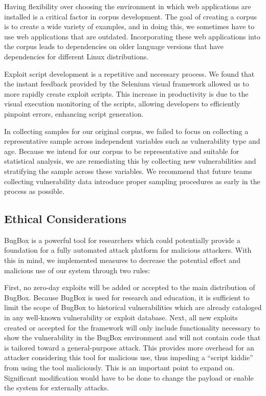 \documentclass[letterpaper,twocolumn,10pt]{article}
\begin{document}
Having flexibility over choosing the environment in which web applications are installed is a critical factor in corpus development.  The goal of creating a corpus is to create a wide variety of examples, and in doing this, we sometimes have to use web applications that are outdated.  Incorporating these web applications into the corpus leads to dependencies on older language versions that have dependencies for different Linux distributions.\par

Exploit script development is a repetitive and necessary process. We found that the instant feedback provided by the Selenium visual framework allowed us to more rapidly create exploit scripts.  This increase in productivity is due to the visual execution monitoring of the scripts, allowing developers to efficiently pinpoint errors, enhancing script generation.  \par

In collecting samples for our original corpus, we failed to focus on collecting a representative sample across independent variables such as vulnerability type and age. Because we intend for our corpus to be representative and suitable for statistical analysis, we are remediating this by collecting new vulnerabilities and stratifying the sample across these variables. We recommend that future teams collecting vulnerability data introduce proper sampling procedures as early in the process as possible.\par

\subsection {Ethical Considerations}
BugBox is a powerful tool for researchers which could potentially provide a foundation for a fully automated attack platform for malicious attackers.  With this in mind, we implemented measures to decrease the potential effect and malicious use of our system through two rules:

First, no zero-day exploits will be added or accepted to the main distribution of BugBox. Because BugBox is used for research and education, it is sufficient to limit the scope of BugBox to historical vulnerabilities which are already cataloged in any well-known vulnerability or exploit database.
Next, all new exploits created or accepted for the framework will only include functionality necessary to show the vulnerability in the BugBox environment and will not contain code that is tailored toward a general-purpose attack.  This provides more overhead for an attacker considering this tool for malicious use, thus impeding a ``script kiddie'' from using the tool maliciously.  This is an important point to expand on.  Significant modification would have to be done to change the payload or enable the system for externally attacks.
\end{document}
